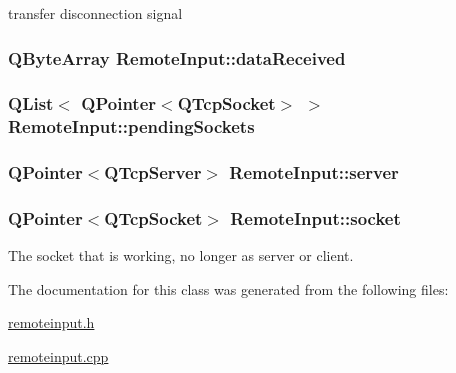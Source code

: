transfer disconnection signal 

\subsubsection[{\texorpdfstring{data\+Received}{dataReceived}}]{\setlength{\rightskip}{0pt plus 5cm}Q\+Byte\+Array Remote\+Input\+::data\+Received\hspace{0.3cm}{\ttfamily [private]}}\hypertarget{classRemoteInput_a32118b1d5726b5435b43b4a80e2b2532}{}\label{classRemoteInput_a32118b1d5726b5435b43b4a80e2b2532}
\subsubsection[{\texorpdfstring{pending\+Sockets}{pendingSockets}}]{\setlength{\rightskip}{0pt plus 5cm}Q\+List$<$ Q\+Pointer$<$Q\+Tcp\+Socket$>$ $>$ Remote\+Input\+::pending\+Sockets\hspace{0.3cm}{\ttfamily [private]}}\hypertarget{classRemoteInput_a8efa826116b9bed6bce016c4f6aedced}{}\label{classRemoteInput_a8efa826116b9bed6bce016c4f6aedced}
\subsubsection[{\texorpdfstring{server}{server}}]{\setlength{\rightskip}{0pt plus 5cm}Q\+Pointer$<$Q\+Tcp\+Server$>$ Remote\+Input\+::server\hspace{0.3cm}{\ttfamily [private]}}\hypertarget{classRemoteInput_a85fb06e7f927436c6fe959935afa4185}{}\label{classRemoteInput_a85fb06e7f927436c6fe959935afa4185}
\subsubsection[{\texorpdfstring{socket}{socket}}]{\setlength{\rightskip}{0pt plus 5cm}Q\+Pointer$<$Q\+Tcp\+Socket$>$ Remote\+Input\+::socket\hspace{0.3cm}{\ttfamily [private]}}\hypertarget{classRemoteInput_a4d02f25eaa512b9dc5459d8296f1d11c}{}\label{classRemoteInput_a4d02f25eaa512b9dc5459d8296f1d11c}


The socket that is working, no longer as server or client. 



The documentation for this class was generated from the following files\+:\begin{DoxyCompactItemize}
\item 
\hyperlink{remoteinput_8h}{remoteinput.\+h}\item 
\hyperlink{remoteinput_8cpp}{remoteinput.\+cpp}\end{DoxyCompactItemize}
